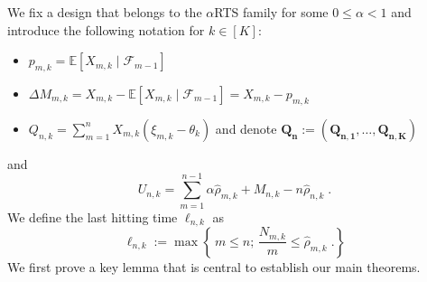 
We fix a design that belongs to the \(\alpha\)RTS family for some \(0\leq\alpha <1\) and introduce the following notation for \(k \in [K]\):
\begin{itemize}
	\item $p_{m,k} = \mathbb{E}[X_{m,k} \mid \mathcal{F}_{m-1}]$	
	\item $\Delta M_{m,k} = X_{m,k} - \mathbb{E}[X_{m,k} \mid \mathcal{F}_{m-1}] = X_{m,k} - p_{m,k}$
	\item $Q_{n,k} = \sum_{m=1}^{n}X_{m,k}(\xi_{m,k} - \theta_{k})$ and denote \(\mathbf{Q_n} := (\mathbf{Q_{n,1}}, \dots, \mathbf{Q_{n,K}})\)	
\end{itemize}
and
	\[U_{n,k} = \sum_{m=1}^{n-1} \alpha \hat{\rho}_{m,k} + M_{n,k} - n \hat{\rho}_{n,k}\;.\]
We define the last hitting time $\ell_{n,k}$ as
\begin{equation}\label{eq:stopping-time-def}
	\ell_{n,k} := \max \left\{\, m \leq n ; \, \frac{N_{m,k}}{m} \leq \hat{\rho}_{m,k}  \;.\right\}
\end{equation}
We first prove a key lemma that is central to establish our main theorems.

